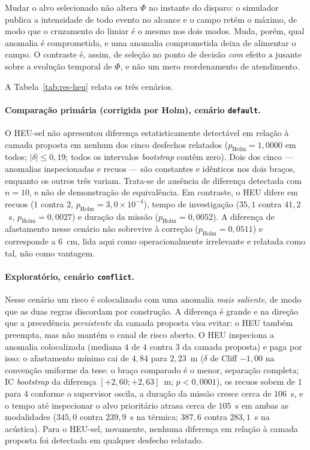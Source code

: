 Mudar o alvo selecionado não altera $\Phi$ no instante do disparo: o simulador
publica a intensidade de todo evento no alcance e o campo retém o máximo, de modo que
o cruzamento do limiar é o mesmo nos dois modos. Muda, porém, qual anomalia é
comprometida, e uma anomalia comprometida deixa de alimentar o campo. O contraste é,
assim, de seleção no ponto de decisão \emph{com} efeito a jusante sobre a evolução
temporal de $\Phi$, e não um mero reordenamento de atendimento.

A Tabela~\ref{tab:res-heu} relata os três cenários.

\paragraph*{Comparação primária (corrigida por Holm), cenário \texttt{default}.}
O HEU-sel não apresentou diferença estatisticamente detectável em relação à camada
proposta em nenhum dos cinco desfechos relatados ($p_{\mathrm{Holm}}=1{,}0000$ em
todos; $|\delta|\le0{,}19$; todos os intervalos \textit{bootstrap} contêm zero).
Dois dos cinco --- anomalias inspecionadas e recuos --- são constantes e idênticos
nos dois braços, enquanto os outros três variam. Trata-se de ausência de diferença
detectada com $n=10$, e não de demonstração de equivalência. Em contraste, o HEU
difere em recuos ($1$ contra $2$, $p_{\mathrm{Holm}}=3{,}0\times10^{-4}$), tempo de
investigação ($35{,}1$ contra $41{,}2$~s, $p_{\mathrm{Holm}}=0{,}0027$) e duração da
missão ($p_{\mathrm{Holm}}=0{,}0052$). A diferença de afastamento nesse cenário não
sobrevive à correção ($p_{\mathrm{Holm}}=0{,}0511$) e corresponde a $6$~cm, lida
aqui como operacionalmente irrelevante e relatada como tal, não como vantagem.

\paragraph*{Exploratório, cenário \texttt{conflict}.}
Nesse cenário um risco é colocalizado com uma anomalia \emph{mais saliente}, de modo
que as duas regras discordam por construção. A diferença é grande e na direção que a
precedência \emph{persistente} da camada proposta visa evitar: o HEU também
preempta, mas não mantém o canal de risco aberto. O HEU inspeciona a anomalia
colocalizada (mediana $4$ de $4$ contra $3$ da camada proposta) e paga por isso: o
afastamento mínimo cai de $4{,}84$ para $2{,}23$~m ($\delta$ de Cliff $-1{,}00$ na
convenção uniforme da tese: o braço comparado é o menor,
separação completa; IC \textit{bootstrap} da diferença $[+2{,}60;+2{,}63]$~m;
$p<0{,}0001$), os recuos sobem de $1$ para $4$ conforme o supervisor oscila, a
duração da missão cresce cerca de $106$~s, e o tempo até inspecionar o alvo
prioritário atrasa cerca de $105$~s em ambas as modalidades ($345{,}0$ contra
$239{,}9$~s na térmica; $387{,}6$ contra $283{,}1$~s na acústica). Para o HEU-sel,
novamente, nenhuma diferença em relação à camada proposta foi detectada em qualquer
desfecho relatado.

